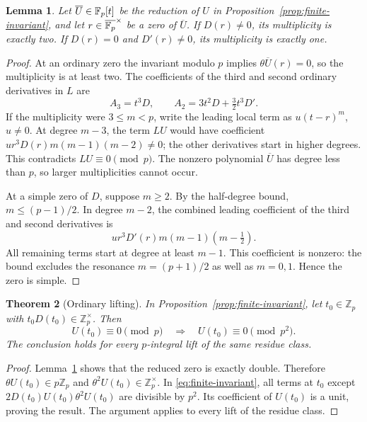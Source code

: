 \documentclass[11pt,a4paper]{article}
\newtheorem{theorem}{Theorem}[section]
\newtheorem{lemma}[theorem]{Lemma}
\theoremstyle{remark}
\newcommand{\Z}{\mathbb Z}\newcommand{\Q}{\mathbb Q}
\begin{document}
\begin{lemma}\label{lem:multiplicities}
Let $\overline U\in\mathbb F_p[t]$ be the reduction of $U$ in
Proposition~\ref{prop:finite-invariant}, and let
$r\in\overline{\mathbb F_p}^{\times}$ be a zero of $\overline U$.
If $D(r)\ne0$, its multiplicity is exactly two.
If $D(r)=0$ and $D'(r)\ne0$, its multiplicity is exactly one.
\end{lemma}
\begin{proof}
At an ordinary zero the invariant modulo $p$ implies
$\theta\overline U(r)=0$, so the multiplicity is at least two.
The coefficients of the third and second ordinary derivatives in $L$ are
\begin{equation}\label{eq:ordinary-L-leading}
 A_3=t^3D,\qquad A_2=3t^2D+\tfrac32t^3D'.
\end{equation}
If the multiplicity were $3\le m<p$, write the leading local term as
$u(t-r)^m$, $u\ne0$. At degree $m-3$, the term $LU$ would have
coefficient $u r^3D(r)m(m-1)(m-2)\ne0$; the other derivatives
start in higher degrees. This contradicts $LU\equiv0\pmod p$.
The nonzero polynomial $\overline U$ has degree less than $p$, so
larger multiplicities cannot occur.

At a simple zero of $D$, suppose $m\ge2$. By the half-degree bound,
$m\le(p-1)/2$. In degree $m-2$, the combined leading coefficient
of the third and second derivatives is
\[
 u r^3D'(r)m(m-1)(m-\tfrac12).
\]
All remaining terms start at degree at least $m-1$.
This coefficient is nonzero: the bound excludes the resonance
$m=(p+1)/2$ as well as $m=0,1$. Hence the zero is simple.
\end{proof}

\begin{theorem}[Ordinary lifting]\label{thm:ordinary-lift}
In Proposition~\ref{prop:finite-invariant}, let $t_0\in\Z_p$ with
$t_0D(t_0)\in\Z_p^\times$. Then
\[
 U(t_0)\equiv0\pmod p\quad\Longrightarrow\quad
 U(t_0)\equiv0\pmod{p^2}.
\]
The conclusion holds for every $p$-integral lift of the same residue class.
\end{theorem}
\begin{proof}
Lemma~\ref{lem:multiplicities} shows that the reduced zero is exactly
double. Therefore $\theta U(t_0)\in p\Z_p$ and
$\theta^2U(t_0)\in\Z_p^\times$.
In \eqref{eq:finite-invariant}, all terms at $t_0$ except
$2D(t_0)U(t_0)\theta^2U(t_0)$ are divisible by $p^2$.
Its coefficient of $U(t_0)$ is a unit, proving the result.
The argument applies to every lift of the residue class.
\end{proof}
\end{document}
